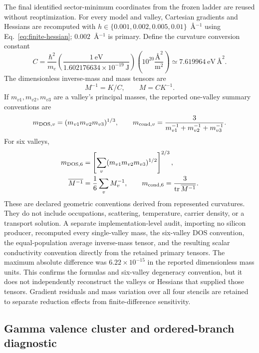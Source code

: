 \documentclass[11pt]{article}
\theoremstyle{definition}
\begin{document}
The final identified sector-minimum coordinates from the frozen ladder are reused
without reoptimization.
For every model and valley, Cartesian gradients and Hessians are recomputed with
$h\in\{0.001,0.002,0.005,0.01\}$~\AA$^{-1}$ using
Eq.~\eqref{eq:finite-hessian}; $0.002$~\AA$^{-1}$ is primary.  Define the curvature
conversion constant
\begin{equation}
 C=\frac{\hbar^2}{m_e}
 \left(\frac{1\ \mathrm{eV}}{1.602176634\times10^{-19}\ \mathrm{J}}\right)
 \left(10^{20}\frac{\text{\AA}^2}{\mathrm{m}^2}\right)
 \simeq 7.619964\ \mathrm{eV}\,\text{\AA}^2.
\end{equation}
The dimensionless inverse-mass
and mass tensors are
\begin{equation}
 M^{-1}=K/C,\qquad M=C K^{-1}.
 \label{eq:mass-tensors}
\end{equation}
If $m_{v1},m_{v2},m_{v3}$ are a valley's principal masses, the reported one-valley
summary conventions are
\begin{equation}
 m_{{\rm DOS},v}=(m_{v1}m_{v2}m_{v3})^{1/3},\qquad
 m_{{\rm cond},v}=\frac{3}{m_{v1}^{-1}+m_{v2}^{-1}+m_{v3}^{-1}}.
 \label{eq:single-valley-masses}
\end{equation}
For six valleys,
\begin{align}
 m_{{\rm DOS},6}&=\left[\sum_v(m_{v1}m_{v2}m_{v3})^{1/2}\right]^{2/3},\\
 \overline{M^{-1}}&=\frac{1}{6}\sum_v M_v^{-1},\qquad
 m_{{\rm cond},6}=\frac{3}{\operatorname{tr}\overline{M^{-1}}}.
 \label{eq:six-valley-masses}
\end{align}
These are declared geometric conventions derived from represented curvatures.  They do
not include occupations, scattering, temperature, carrier density, or a transport
solution.  A separate implementation-level audit, importing no silicon producer,
recomputed every single-valley mass, the six-valley DOS convention, the equal-population
average inverse-mass tensor, and the resulting scalar conductivity convention directly
from the retained primary tensors.  The maximum absolute difference was
$6.22\times10^{-15}$ in the reported dimensionless mass units.  This confirms the
formulas and six-valley degeneracy convention, but it does not independently reconstruct
the valleys or Hessians that supplied those tensors.  Gradient residuals and mass
variation over all four stencils are retained to separate reduction effects from
finite-difference sensitivity.

\subsection{Gamma valence cluster and ordered-branch diagnostic}
\end{document}
